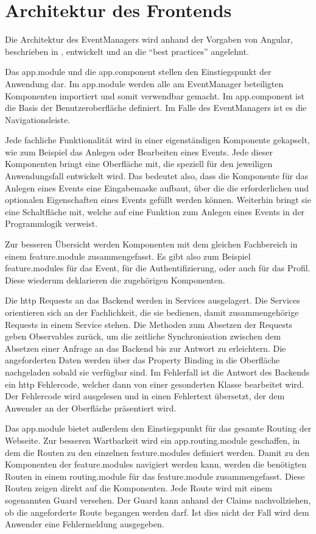 

\section{Architektur des Frontends}

Die Architektur des EventManagers wird anhand der Vorgaben von Angular, beschrieben in , entwickelt und an die \enquote{best practices} angelehnt.

Das app.module und die app.component stellen den Einstiegspunkt der Anwendung dar. Im app.module werden alle am EventManager beteiligten Komponenten importiert und somit verwendbar gemacht. Im app.component ist die Basis der Benutzeroberfläche definiert. Im Falle des EventManagers ist es die Navigationsleiste.

Jede fachliche Funktionalität wird in einer eigenständigen Komponente gekapselt, wie zum Beispiel das Anlegen oder Bearbeiten eines Events. Jede dieser Komponenten bringt eine Oberfläche mit, die speziell für den jeweiligen Anwendungsfall entwickelt wird. Das bedeutet also, dass die Komponente für das Anlegen eines Events eine Eingabemaske aufbaut, über die die erforderlichen und optionalen Eigenschaften eines Events gefüllt werden können. Weiterhin bringt sie eine Schaltfläche mit, welche auf eine Funktion zum Anlegen eines Events in der Programmlogik verweist.

Zur besseren Übersicht werden Komponenten mit dem gleichen Fachbereich in einem feature.module zusammengefasst. Es gibt also zum Beispiel feature.mod\-ules für das Event, für die Authentifizierung, oder auch für das Profil. Diese wiederum deklarieren die zugehörigen Komponenten.

Die \gls{http} Requests an das Backend werden in Services ausgelagert. Die Services orientieren sich an der Fachlichkeit, die sie bedienen, damit zusammengehörige Requests in einem Service stehen. Die Methoden zum Absetzen der Requests geben Observables zurück, um die zeitliche Synchronisation zwischen dem Absetzen einer Anfrage an das Backend bis zur Antwort zu erleichtern. Die angeforderten Daten werden über das Property Binding in die Oberfläche nachgeladen sobald sie verfügbar sind. Im Fehlerfall ist die Antwort des Backends ein \gls{http} Fehlercode, welcher dann von einer gesonderten Klasse bearbeitet wird. Der Fehlercode wird ausgelesen und in einen Fehlertext übersetzt, der dem Anwender an der Oberfläche präsentiert wird.

Das app.module bietet außerdem den Einstiegspunkt für das gesamte Routing der Webseite. Zur besseren Wartbarkeit wird ein app.routing.module geschaffen, in dem die Routen zu den einzelnen feature.modules definiert werden. Damit zu den Komponenten der feature.modules navigiert werden kann, werden die benötigten Routen in einem routing.module für das feature.module zusammengefasst. Diese Routen zeigen direkt auf die Komponenten. Jede Route wird mit einem sogenannten Guard versehen. Der Guard kann anhand der Claims nachvollziehen, ob die angeforderte Route begangen werden darf. Ist dies nicht der Fall wird dem Anwender eine Fehlermeldung ausgegeben.
